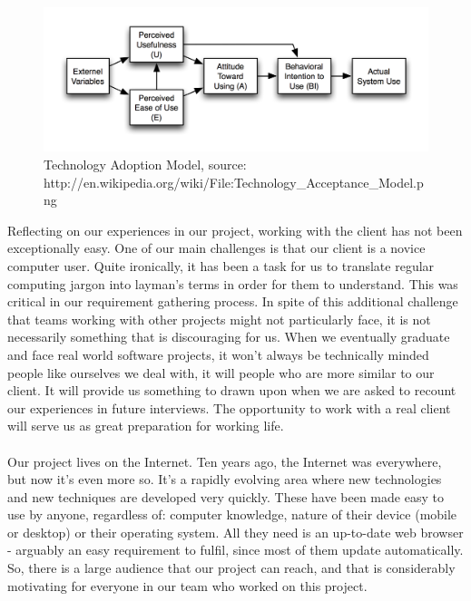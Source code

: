 \documentclass{l3proj}
\begin{document}
\begin{figure}
\begin{center}
\includegraphics{tam}
\caption{Technology Adoption Model, source: \small{http://en.wikipedia.org/wiki/File:Technology\_Acceptance\_Model.png}}
\end{center}
\end{figure}

Reflecting on our experiences in our project, working with the client has not
been exceptionally easy. One of our main challenges is that our client is a
novice computer user. Quite ironically, it has been a task for us to translate
regular computing jargon into layman's terms in order for them to understand.
This was critical in our requirement gathering process. In spite of this
additional challenge that teams working with other projects might not
particularly face, it is not necessarily something that is discouraging for us.
When we eventually graduate and face real world software projects, it won't
always be technically minded people like ourselves we deal with, it will people
who are more similar to our client. It will provide us something to drawn upon
when we are asked to recount our experiences in future interviews. The
opportunity to work with a real client will serve us as great preparation for
working life.\\
\\
Our project lives on the Internet. Ten years ago, the Internet was everywhere,
but now it's even more so. It's a rapidly evolving area where new technologies
and new techniques are developed very quickly. These have been made easy to use
by anyone, regardless of: computer knowledge, nature of their device (mobile or
desktop) or their operating system. All they need is an up-to-date web browser -
arguably an easy requirement to fulfil, since most of them update
automatically. So, there is a large audience that our project can reach, and
that is considerably motivating for everyone in our team who worked on this
project.\\
\end{document}
